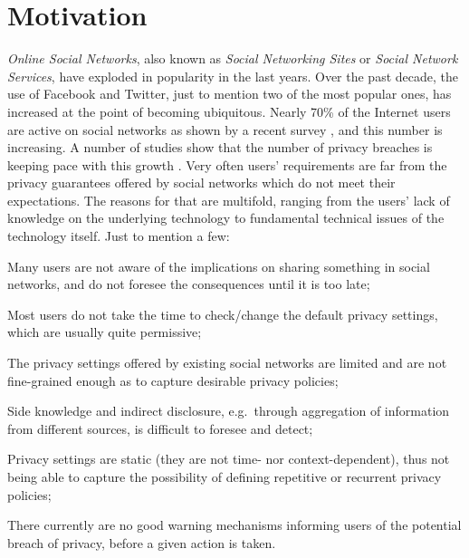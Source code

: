 \section{Motivation}
\label{sec:motivation}

{\em Online Social Networks}, also known as {\em Social Networking Sites} or {\em Social Network Services}, have exploded in popularity in the last years.
Over the past decade, the use of Facebook and Twitter, just to mention two of the most popular ones, has increased at the point of becoming ubiquitous.
Nearly 70\% of the Internet users are active on social networks as shown by a recent survey \cite{SNSuse}, and this number is increasing.
A number of studies show that the number of privacy breaches is keeping pace with this growth \cite{MJB12spse+,JEM12fpc,YKBA11afps+,MJB11fosn+}.
Very often users' requirements are far from the privacy guarantees offered by social networks  which do not meet their expectations. The reasons for that are multifold, ranging from the users' lack of knowledge on the underlying technology to fundamental technical issues of the technology itself. Just to mention a few:
\begin{inparaenum}[i)]
\item Many users are not aware of the implications on sharing something in social networks, and do not foresee the consequences until it is too late;
\item Most users do not take the time to check/change the default privacy settings, which are usually quite permissive;
\item The privacy settings offered by existing social networks are limited and are not fine-grained enough as to capture desirable privacy policies;
\item Side knowledge and indirect disclosure, e.g.~through aggregation of information from different sources, is difficult to foresee and detect;
\item Privacy settings are static (they are not time- nor context-dependent), thus not being able to capture the possibility of defining repetitive or recurrent privacy policies;
\item There currently are no good warning mechanisms informing users of the potential breach of privacy, before a given action is taken.
\end{inparaenum}


